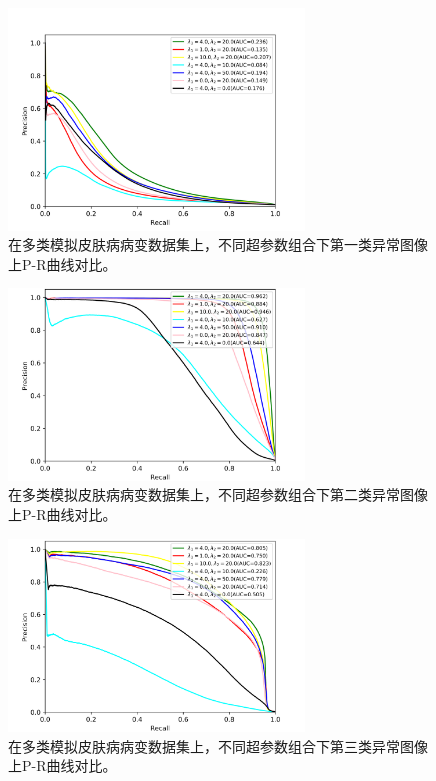 \begin{figure}[H]
	\centering
	\includegraphics[width=0.7\textwidth]{figure/pr_curve_multi_skin_hyper_paras/IMAGE_NET_pr_curve.png}
	\caption[不同超参数组合下第一类异常图像上P-R曲线对比]{在多类模拟皮肤病病变数据集上，不同超参数组合下第一类异常图像上P-R曲线对比。} 
	\label{fig:multi_simulate_pr_curve_image_net_hyper_paras}
\end{figure}
\vspace{-0.3cm}
\begin{figure}[H]
	\centering
	\includegraphics[width=0.7\textwidth]{figure/pr_curve_multi_skin_hyper_paras/SKIN_pr_curve.png}
	\caption[不同超参数组合下第二类异常图像上P-R曲线对比]{在多类模拟皮肤病病变数据集上，不同超参数组合下第二类异常图像上P-R曲线对比。}
	\label{fig:multi_simulate_pr_curve_skin_hyper_paras}
\end{figure}
\begin{figure}[H]
	\centering
	\includegraphics[width=0.7\textwidth]{figure/pr_curve_multi_skin_hyper_paras/CIRCLE_pr_curve.png}
	\caption[不同超参数组合下第三类异常图像上P-R曲线对比]{在多类模拟皮肤病病变数据集上，不同超参数组合下第三类异常图像上P-R曲线对比。} 
	\label{fig:multi_simulate_pr_curve_circle_hyper_paras}
\end{figure}

